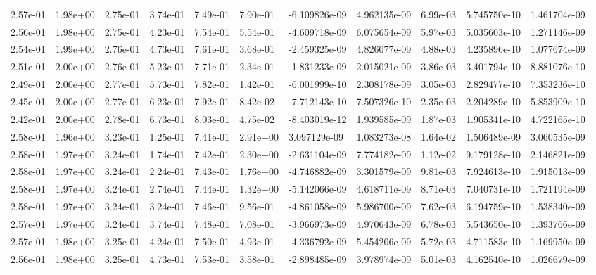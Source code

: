 \begin{longtable}{| p{} | p{} |}
2.57e-01 & 1.98e+00 & 2.75e-01 & 3.74e-01 & 7.49e-01 & 7.90e-01 & -6.109826e-09 &  4.962135e-09 &  6.99e-03 &  5.745750e-10 &  1.461704e-09 \\
2.56e-01 & 1.98e+00 & 2.75e-01 & 4.23e-01 & 7.54e-01 & 5.54e-01 & -4.609718e-09 &  6.075654e-09 &  5.97e-03 &  5.035603e-10 &  1.271146e-09 \\
2.54e-01 & 1.99e+00 & 2.76e-01 & 4.73e-01 & 7.61e-01 & 3.68e-01 & -2.459325e-09 &  4.826077e-09 &  4.88e-03 &  4.235896e-10 &  1.077674e-09 \\
2.51e-01 & 2.00e+00 & 2.76e-01 & 5.23e-01 & 7.71e-01 & 2.34e-01 & -1.831233e-09 &  2.015021e-09 &  3.86e-03 &  3.401794e-10 &  8.881076e-10 \\
2.49e-01 & 2.00e+00 & 2.77e-01 & 5.73e-01 & 7.82e-01 & 1.42e-01 & -6.001999e-10 &  2.308178e-09 &  3.05e-03 &  2.829477e-10 &  7.353236e-10 \\
2.45e-01 & 2.00e+00 & 2.77e-01 & 6.23e-01 & 7.92e-01 & 8.42e-02 & -7.712143e-10 &  7.507326e-10 &  2.35e-03 &  2.204289e-10 &  5.853909e-10 \\
2.42e-01 & 2.00e+00 & 2.78e-01 & 6.73e-01 & 8.03e-01 & 4.75e-02 & -8.403019e-12 &  1.939585e-09 &  1.87e-03 &  1.905341e-10 &  4.722165e-10 \\
2.58e-01 & 1.96e+00 & 3.23e-01 & 1.25e-01 & 7.41e-01 & 2.91e+00 &  3.097129e-09 &  1.083273e-08 &  1.64e-02 &  1.506489e-09 &  3.060535e-09 \\
2.58e-01 & 1.97e+00 & 3.24e-01 & 1.74e-01 & 7.42e-01 & 2.30e+00 & -2.631104e-09 &  7.774182e-09 &  1.12e-02 &  9.179128e-10 &  2.146821e-09 \\
2.58e-01 & 1.97e+00 & 3.24e-01 & 2.24e-01 & 7.43e-01 & 1.76e+00 & -4.746882e-09 &  3.301579e-09 &  9.81e-03 &  7.924613e-10 &  1.915013e-09 \\
2.58e-01 & 1.97e+00 & 3.24e-01 & 2.74e-01 & 7.44e-01 & 1.32e+00 & -5.142066e-09 &  4.618711e-09 &  8.71e-03 &  7.040731e-10 &  1.721194e-09 \\
2.58e-01 & 1.97e+00 & 3.24e-01 & 3.24e-01 & 7.46e-01 & 9.56e-01 & -4.861058e-09 &  5.986700e-09 &  7.62e-03 &  6.194759e-10 &  1.538340e-09 \\
2.57e-01 & 1.97e+00 & 3.24e-01 & 3.74e-01 & 7.48e-01 & 7.08e-01 & -3.966973e-09 &  4.970643e-09 &  6.78e-03 &  5.543650e-10 &  1.393766e-09 \\
2.57e-01 & 1.98e+00 & 3.25e-01 & 4.24e-01 & 7.50e-01 & 4.93e-01 & -4.336792e-09 &  5.454206e-09 &  5.72e-03 &  4.711583e-10 &  1.169950e-09 \\
2.56e-01 & 1.98e+00 & 3.25e-01 & 4.73e-01 & 7.53e-01 & 3.58e-01 & -2.898485e-09 &  3.978974e-09 &  5.01e-03 &  4.162540e-10 &  1.026679e-09 \\

\end{longtable}
